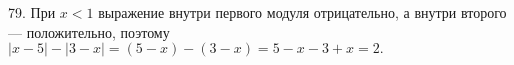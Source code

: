 79. При $x<1$ выражение внутри первого модуля отрицательно, а внутри второго --- положительно, поэтому $|x-5|-|3-x|=(5-x)-(3-x)=5-x-3+x=2.$\\
